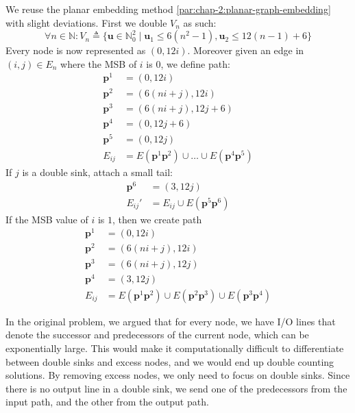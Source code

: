 We reuse the planar embedding method \ref{par:chap-2:planar-graph-embedding}
with slight deviations. First we double $V_n$ as such:
\[
    \forall n \in \mathbb{N}:  V_n \triangleq \Big\{\mathbf{u} \in \mathbb{N}_0^2\mid \mathbf{u}_1 \leq 6(n^2 - 1) , \mathbf{u}_2 \leq 12(n - 1) + 6 \Big\}
\]
Every node is now represented as $(0, 12i)$.
Moreover given an edge in $(i,j) \in E_{n}$ where the MSB of $i$ is $0$, we define path:
\begin{align*}
    \mathbf{p}^1 & = (0, 12i)                                                                 \\
    \mathbf{p}^2 & = (6(ni + j), 12i)                                                         \\
    \mathbf{p}^3 & = (6(ni + j), 12j + 6)                                                     \\
    \mathbf{p}^4 & = (0, 12j + 6)                                                             \\
    \mathbf{p}^5 & = (0, 12j)                                                                 \\
    E_{ij}       & = E(\mathbf{p}^1\mathbf{p}^2) \cup \dots  \cup E(\mathbf{p}^4\mathbf{p}^5)
\end{align*}
If $j$ is a double sink, attach a small tail:
\begin{align*}
    \mathbf{p}^6 & = (3, 12j)                                \\
    E_{ij}'      & = E_{ij} \cup E(\mathbf{p}^5\mathbf{p}^6)
\end{align*}
If the MSB value of $i$ is $1$, then we create path
\begin{align*}
    \mathbf{p}^1 & = (0,12i)                                                                                       \\
    \mathbf{p}^2 & = (6(ni + j), 12i)                                                                              \\
    \mathbf{p}^3 & = (6(ni + j), 12j)                                                                              \\
    \mathbf{p}^4 & = (3, 12j)                                                                                      \\
    E_{ij}       & = E(\mathbf{p}^1\mathbf{p}^2) \cup E(\mathbf{p}^2\mathbf{p}^3) \cup E(\mathbf{p}^3\mathbf{p}^4)
\end{align*}

In the original problem, we argued that for every node, we have I/O lines that denote the successor and predecessors of the current node,
which can be exponentially large.
This would make it computationally difficult to differentiate between double sinks and excess nodes, and we would end up double counting solutions.
By removing excess nodes, we only need to focus on double sinks. Since there is no output line in a double sink,
we send one of the predecessors from the input path, and the other from the output path.

